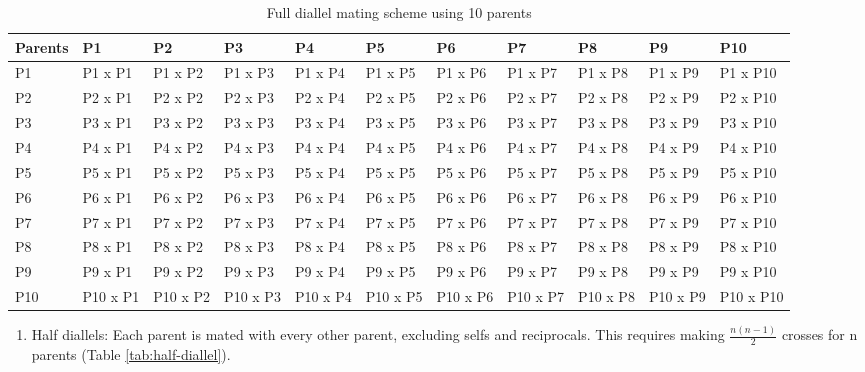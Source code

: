 \documentclass[nofonts,]{tufte-handout}
\providecommand{\tightlist}{%
  \setlength{\itemsep}{0pt}\setlength{\parskip}{0pt}}
\begin{document}
\begin{longtable}{>{\raggedright\arraybackslash}p{3.5em}>{\raggedright\arraybackslash}p{3.5em}>{\raggedright\arraybackslash}p{3.5em}>{\raggedright\arraybackslash}p{3.5em}>{\raggedright\arraybackslash}p{3.5em}>{\raggedright\arraybackslash}p{3.5em}>{\raggedright\arraybackslash}p{3.5em}>{\raggedright\arraybackslash}p{3.5em}>{\raggedright\arraybackslash}p{3.5em}>{\raggedright\arraybackslash}p{3.5em}>{\raggedright\arraybackslash}p{3.5em}}
\caption{\label{tab:full-diallel}Full diallel mating scheme using 10 parents}\\
\toprule
Parents & P1 & P2 & P3 & P4 & P5 & P6 & P7 & P8 & P9 & P10\\
\midrule
\rowcolor{gray!6}  P1 & P1 x P1 & P1 x P2 & P1 x P3 & P1 x P4 & P1 x P5 & P1 x P6 & P1 x P7 & P1 x P8 & P1 x P9 & P1 x P10\\
P2 & P2 x P1 & P2 x P2 & P2 x P3 & P2 x P4 & P2 x P5 & P2 x P6 & P2 x P7 & P2 x P8 & P2 x P9 & P2 x P10\\
\rowcolor{gray!6}  P3 & P3 x P1 & P3 x P2 & P3 x P3 & P3 x P4 & P3 x P5 & P3 x P6 & P3 x P7 & P3 x P8 & P3 x P9 & P3 x P10\\
P4 & P4 x P1 & P4 x P2 & P4 x P3 & P4 x P4 & P4 x P5 & P4 x P6 & P4 x P7 & P4 x P8 & P4 x P9 & P4 x P10\\
\rowcolor{gray!6}  P5 & P5 x P1 & P5 x P2 & P5 x P3 & P5 x P4 & P5 x P5 & P5 x P6 & P5 x P7 & P5 x P8 & P5 x P9 & P5 x P10\\
\addlinespace
P6 & P6 x P1 & P6 x P2 & P6 x P3 & P6 x P4 & P6 x P5 & P6 x P6 & P6 x P7 & P6 x P8 & P6 x P9 & P6 x P10\\
\rowcolor{gray!6}  P7 & P7 x P1 & P7 x P2 & P7 x P3 & P7 x P4 & P7 x P5 & P7 x P6 & P7 x P7 & P7 x P8 & P7 x P9 & P7 x P10\\
P8 & P8 x P1 & P8 x P2 & P8 x P3 & P8 x P4 & P8 x P5 & P8 x P6 & P8 x P7 & P8 x P8 & P8 x P9 & P8 x P10\\
\rowcolor{gray!6}  P9 & P9 x P1 & P9 x P2 & P9 x P3 & P9 x P4 & P9 x P5 & P9 x P6 & P9 x P7 & P9 x P8 & P9 x P9 & P9 x P10\\
P10 & P10 x P1 & P10 x P2 & P10 x P3 & P10 x P4 & P10 x P5 & P10 x P6 & P10 x P7 & P10 x P8 & P10 x P9 & P10 x P10\\
\bottomrule
\end{longtable}
\endgroup{}

\begin{enumerate}
\def\labelenumi{\arabic{enumi}.}
\setcounter{enumi}{1}
\tightlist
\item
  Half diallels: Each parent is mated with every other parent, excluding
  selfs and reciprocals. This requires making \(\frac{n(n-1)}{2}\)
  crosses for n parents (Table \ref{tab:half-diallel}).
\end{enumerate}
\end{document}
